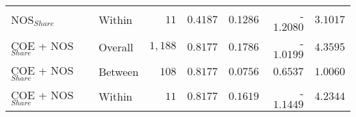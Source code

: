 \documentclass[a4paper]{article}
\begin{document}
\begin{table}[h!]
\begin{tabular}{llrrrrr}
NOS$_{Share}$ & Within & $11$ & $0.4187$ & $0.1286$ & -$1.2080$ & $3.1017$ \\ 
COE + NOS$_{Share}$ & Overall & $1,188$ & $0.8177$ & $0.1786$ & -$1.0199$ & $4.3595$ \\ 
COE + NOS$_{Share}$ & Between & $108$ & $0.8177$ & $0.0756$ & $0.6537$ & $1.0060$ \\ 
COE + NOS$_{Share}$ & Within & $11$ & $0.8177$ & $0.1619$ & -$1.1449$ & $4.2344$ \\ 
\bottomrule
\end{tabular} 
\end{table} 
\FloatBarrier
\end{document}
